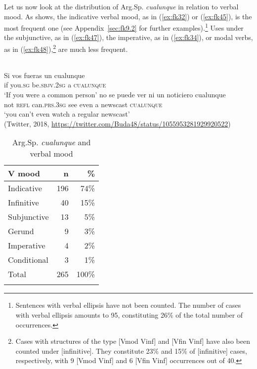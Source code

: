 \documentclass[output=paper,colorlinks,citecolor=brown]{langscibook}
\begin{document}
Let us now look at the distribution of Arg.Sp. \textit{cualunque} in relation to verbal mood. As  shows, the indicative verbal mood, as in (\ref{ex:fk32}) or (\ref{ex:fk45}), is the most frequent one (see Appendix~\ref{sec:fk9.2} for further examples).\footnote{Sentences with verbal ellipsis have not been counted. The number of cases with verbal ellipsis amounts to 95, constituting 26\% of the total number of occurrences.}  Uses under the subjunctive, as in (\ref{ex:fk47}), the imperative, as in (\ref{ex:fk34}), or modal verbs, as in (\ref{ex:fk48}),\footnote{Cases with structures of the type [Vmod Vinf] and [Vfin Vinf] have also been counted under [infinitive]. They constitute 23\% and 15\% of [infinitive] cases, respectively, with 9 [Vmod Vinf] and 6 [Vfin Vinf] occurrences out of 40.}  are much less frequent.

\ea\label{ex:fk47}
    \citep[][287]{Medina1989}\\
    \gll Si vos fueras un cualunque \\
    if you.\textsc{sg} be.\textsc{sbjv.2sg} a \textsc{cualunque}\\
    \glt ‘If you were a common person’
\ex\label{ex:fk48}
    \gll no se puede ver ni un noticiero cualunque\\
    not \textsc{refl} can.\textsc{prs.3sg} see even a newscast \textsc{cualunque}\\
    \glt ‘you can’t even watch a regular newscast’\\
   (Twitter, 2018, \url{https://twitter.com/Buda48/status/1055953281929920522})
\z

\begin{table}
    \begin{tabular}{lrr}
    \lsptoprule
       V mood      & n   & \% \\
    \midrule
       Indicative  & 196 & 74\% \\
       Infinitive  & 40  & 15\% \\
       Subjunctive & 13  & 5\% \\
       Gerund      & 9   & 3\% \\
       Imperative  & 4   & 2\% \\ 
       Conditional & 3   & 1\% \\
    \midrule
       Total       & 265 & 100\% \\
    \lspbottomrule
    \end{tabular}
    \caption{Arg.Sp. \textit{cualunque} and verbal mood}
    \label{tab:fk6}
\end{table}
\end{document}

